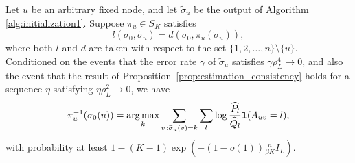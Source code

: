 \documentclass{article}
\begin{document}
\begin{proposition}
\label{prop:single_node_error_bound}
Let $u$ be an arbitrary fixed node, and let $\tilde \sigma_u$ be the output of Algorithm \ref{alg:initialization1}. Suppose $\pi_u \in S_K$ satisfies
$$l(\sigma_0, \tilde \sigma_u) = d(\sigma_0, \pi_u(\tilde \sigma_u)),$$
where both $l$ and $d$ are taken with respect to the set $\{1, 2, \dots, n\} \setminus \{u\}$. %
Conditioned on the events that the error rate $\gamma$ of $\tilde \sigma_u$ satisfies $\gamma \rho_L^4 \to 0$, and also the event that the result of Proposition~\ref{prop:estimation_consistency} holds for a sequence $\eta$ satisfying $\eta \rho_L^2 \rightarrow 0$, we have
\[
\pi_u^{-1}(\sigma_0(u)) = \mathop{\text{\rm arg\,max}}_k \sum_{v\,: \widetilde \sigma_u(v)=k} \sum_l \log \frac{\widehat{P}_l}{\widehat{Q}_l} \mbox{\boldmath $1$}(A_{uv} = l),
\]
with probability at least $1 - (K-1)\exp \left( - (1 - o(1)) \frac{n}{\beta K} I_L \right)$.\end{proposition}
\end{document}
